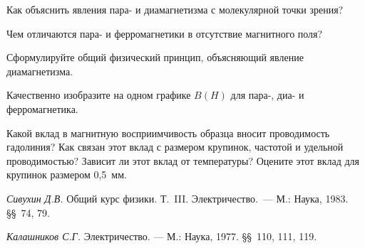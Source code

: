 \begin{lab:questions}

	\item Как объяснить явления пара- и диамагнетизма с молекулярной точки зрения?
	
	\item Чем отличаются пара- и ферромагнетики в отсутствие магнитного поля?
	
	\item Сформулируйте общий физический принцип, объясняющий явление диамагнетизма.
	
	\item Качественно изобразите на одном графике $B(H)$ для пара-, диа- и ферромагнетика.
	
	\item Какой вклад в магнитную восприимчивость образца вносит проводимость гадолиния? Как связан этот вклад с размером 
	крупинок, частотой и удельной проводимостью? Зависит ли этот вклад от температуры? Оцените этот вклад для крупинок
	размером 0,5~мм.
\end{lab:questions}


\begin{lab:literature}
	\item \emph {Сивухин Д.В.} Общий курс физики. Т.~III. Электричество.~--- М.: Наука, 1983. \S\S~74, 79.
	
	\item \emph{Калашников С.Г.} Электричество. --- М.: Наука, 1977. \S\S~110, 111, 119.
\end{lab:literature}

